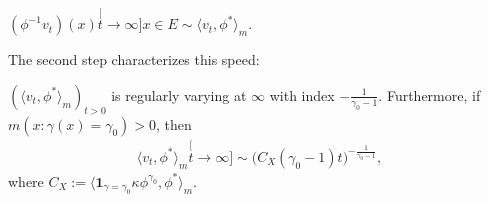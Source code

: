 \begin{prop}
\label{prop: convergence in a same speed}
	$(\phi^{-1}v_t)(x) \stackrel[t\to\infty]{x\in E}{\sim} \langle v_t,\phi^*\rangle_m$.
\end{prop}
\label{prop: asymptotic equivalence of vtphi}
	The second step characterizes this speed:
\begin{prop}
\label{prop: regularly varying of vt-phi-star}
	$(\langle v_t,\phi^*\rangle_m)_{t> 0} $ is regularly varying at $\infty$ with index $-\frac{1}{\gamma_0-1}$.
	Furthermore, if $m(x: \gamma (x)= \gamma_0)>0$, then
\begin{align}
	\langle v_t,\phi^*\rangle_m
	\stackrel[t\to \infty]{}{\sim} \big(C_X(\gamma_0-1) t \big)^{-\frac{1}{\gamma_0 - 1}},
\end{align}
	where $C_X:= \langle \mathbf 1_{\gamma= \gamma_0} \kappa \phi^{\gamma_0}, \phi^* \rangle_m $.
\end{prop}



